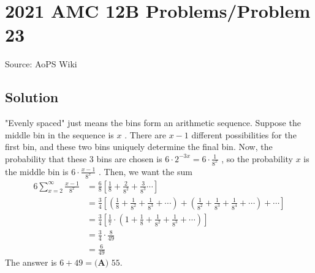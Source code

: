 \documentclass[12pt]{article}
\begin{document}
\section*{{2021 AMC 12B Problems/Problem 23}}
Source: AoPS Wiki

\subsection*{Solution}
"Evenly spaced" just means the bins form an arithmetic sequence. Suppose the middle bin in the sequence is $x$ . There are $x-1$ different possibilities for the first bin, and these two bins uniquely determine the final bin. Now, the probability that these $3$ bins are chosen is $6\cdot 2^{-3x} = 6\cdot \frac{1}{8^x}$ , so the probability $x$ is the middle bin is $6\cdot\frac{x-1}{8^x}$ . Then, we want the sum \begin{align*} 6\sum_{x=2}^{\infty}\frac{x-1}{8^x} &= \frac{6}{8}\left[\frac{1}{8} + \frac{2}{8^2} + \frac{3}{8^3}\cdots\right]\\ &= \frac34\left[\left(\frac{1}{8} + \frac{1}{8^2} + \frac{1}{8^3}+\cdots \right) + \left(\frac{1}{8^2} + \frac{1}{8^3} + \frac{1}{8^4} + \cdots \right) + \cdots\right]\\ &= \frac34\left[\frac17\cdot \left(1 + \frac{1}{8} + \frac{1}{8^2} + \frac{1}{8^3} + \cdots \right)\right]\\ &= \frac34\cdot \frac{8}{49}\\ &= \frac{6}{49} \end{align*} The answer is $6+49=\boxed{\textbf{(A) }55}.$
\end{document}
